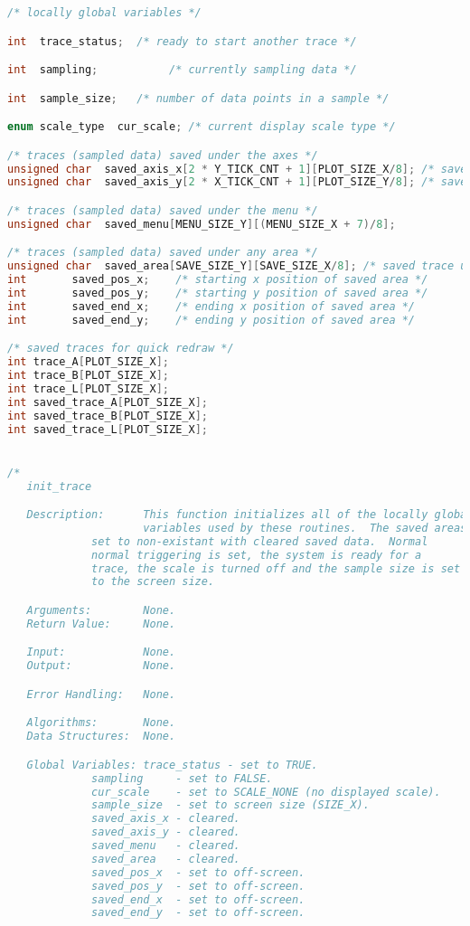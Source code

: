 \begin{lstlisting}[language=C]
/* locally global variables */

int  trace_status;	/* ready to start another trace */

int  sampling;           /* currently sampling data */

int  sample_size; 	/* number of data points in a sample */

enum scale_type  cur_scale;	/* current display scale type */

/* traces (sampled data) saved under the axes */
unsigned char  saved_axis_x[2 * Y_TICK_CNT + 1][PLOT_SIZE_X/8];	/* saved trace under x lines */
unsigned char  saved_axis_y[2 * X_TICK_CNT + 1][PLOT_SIZE_Y/8];	/* saved trace under y lines */

/* traces (sampled data) saved under the menu */
unsigned char  saved_menu[MENU_SIZE_Y][(MENU_SIZE_X + 7)/8];

/* traces (sampled data) saved under any area */
unsigned char  saved_area[SAVE_SIZE_Y][SAVE_SIZE_X/8]; /* saved trace under any area */
int	      saved_pos_x;    /* starting x position of saved area */
int	      saved_pos_y;    /* starting y position of saved area */
int	      saved_end_x;    /* ending x position of saved area */
int	      saved_end_y;    /* ending y position of saved area */

/* saved traces for quick redraw */
int trace_A[PLOT_SIZE_X];
int trace_B[PLOT_SIZE_X];
int trace_L[PLOT_SIZE_X];
int saved_trace_A[PLOT_SIZE_X];
int saved_trace_B[PLOT_SIZE_X];
int saved_trace_L[PLOT_SIZE_X];


/*
   init_trace

   Description:      This function initializes all of the locally global
                     variables used by these routines.  The saved areas are
		     set to non-existant with cleared saved data.  Normal
		     normal triggering is set, the system is ready for a
		     trace, the scale is turned off and the sample size is set
		     to the screen size.

   Arguments:        None.
   Return Value:     None.

   Input:            None.
   Output:           None.

   Error Handling:   None.

   Algorithms:       None.
   Data Structures:  None.

   Global Variables: trace_status - set to TRUE.
		     sampling     - set to FALSE.
		     cur_scale    - set to SCALE_NONE (no displayed scale).
		     sample_size  - set to screen size (SIZE_X).
		     saved_axis_x - cleared.
		     saved_axis_y - cleared.
		     saved_menu   - cleared.
		     saved_area   - cleared.
		     saved_pos_x  - set to off-screen.
		     saved_pos_y  - set to off-screen.
		     saved_end_x  - set to off-screen.
		     saved_end_y  - set to off-screen.


\end{lstlisting}
